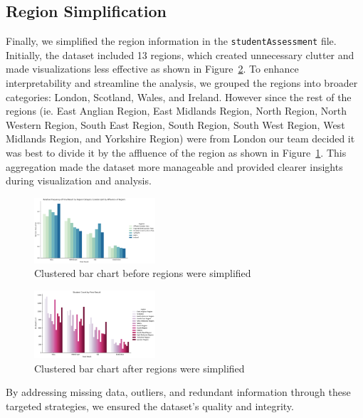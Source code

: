 \subsection*{Region Simplification}
Finally, we simplified the region information in the \texttt{studentAssessment} file. Initially, the dataset included 13 regions, which created unnecessary clutter and made visualizations less effective as shown in Figure~\ref{clutteredb}. To enhance interpretability and streamline the analysis, we grouped the regions into broader categories: London, Scotland, Wales, and Ireland. However since the rest of the regions (ie. East Anglian Region, East Midlands Region, North Region, North Western Region, South East Region, South Region, South West Region, West Midlands Region, and Yorkshire Region) were from London our team decided it was best to divide it by the affluence of the region as shown in Figure~\ref{sixregbg}\cite{IMD2019}. This aggregation made the dataset more manageable and provided clearer insights during visualization and analysis.

\begin{figure}[h]
    \centering
    \includegraphics[width=0.40\textwidth]{photo/sixregionbg.PNG}
    \caption{Clustered bar chart before regions were simplified}
    \label{sixregbg}
\end{figure}

\begin{figure}[h]
    \centering
    \includegraphics[width=0.40\textwidth]{photo/clutteredbar.PNG}
    \caption{Clustered bar chart after regions were simplified}
    \label{clutteredb}
\end{figure}


By addressing missing data, outliers, and redundant information through these targeted strategies, we ensured the dataset's quality and integrity.

